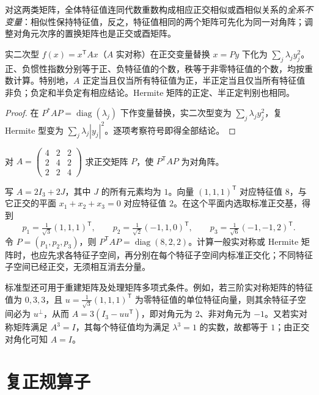 对这两类矩阵，全体特征值连同代数重数构成相应正交相似或酉相似关系的\emph{全系不变量}：相似性保持特征值，反之，特征值相同的两个矩阵可先化为同一对角阵；调整对角元次序的置换矩阵也是正交或酉矩阵。

\begin{corollary}
\label{cor:quadratic-spectral-criterion}
实二次型 $f(x)=x^{\mathsf T}Ax$（$A$ 实对称）在正交变量替换 $x=Py$ 下化为 $\sum_j\lambda_jy_j^2$。正、负惯性指数分别等于正、负特征值的个数，秩等于非零特征值的个数，均按重数计算。特别地，$A$ 正定当且仅当所有特征值为正，半正定当且仅当所有特征值非负；负定和半负定有相应结论。Hermite 矩阵的正定、半正定判别也相同。
\end{corollary}
\begin{proof}
在 $P^*AP=\operatorname{diag}(\lambda_j)$ 下作变量替换，实二次型变为 $\sum_j\lambda_jy_j^2$，复 Hermite 型变为 $\sum_j\lambda_j|y_j|^2$。逐项考察符号即得全部结论。
\end{proof}

\begin{example}
\label{ex:symmetric-diagonalization}
对 $A=\begin{pmatrix}4&2&2\\2&4&2\\2&2&4\end{pmatrix}$ 求正交矩阵 $P$，使 $P^{\mathsf T}AP$ 为对角阵。
\end{example}
\begin{solve}
写 $A=2I_3+2J$，其中 $J$ 的所有元素均为 $1$。向量 $(1,1,1)^{\mathsf T}$ 对应特征值 $8$，与它正交的平面 $x_1+x_2+x_3=0$ 对应特征值 $2$。在这个平面内选取标准正交基，得到
\[
    p_1=\tfrac1{\sqrt3}(1,1,1)^{\mathsf T},\qquad
    p_2=\tfrac1{\sqrt2}(-1,1,0)^{\mathsf T},\qquad
    p_3=\tfrac1{\sqrt6}(-1,-1,2)^{\mathsf T}.
\]
令 $P=(p_1,p_2,p_3)$，则 $P^{\mathsf T}AP=\operatorname{diag}(8,2,2)$。计算一般实对称或 Hermite 矩阵时，也应先求各特征子空间，再分别在每个特征子空间内标准正交化；不同特征子空间已经正交，无须相互消去分量。
\end{solve}

标准型还可用于重建矩阵及处理矩阵多项式条件。例如，若三阶实对称矩阵的特征值为 $0,3,3$，且 $u=\tfrac1{\sqrt3}(1,1,1)^{\mathsf T}$ 为零特征值的单位特征向量，则其余特征子空间必为 $u^\perp$，从而 $A=3(I_3-uu^{\mathsf T})$，即对角元为 $2$、非对角元为 $-1$。又若实对称矩阵满足 $A^3=I$，其每个特征值均为满足 $\lambda^3=1$ 的实数，故都等于 $1$；由正交对角化可知 $A=I$。

\section{复正规算子}
\label{sec:complex-normal}

